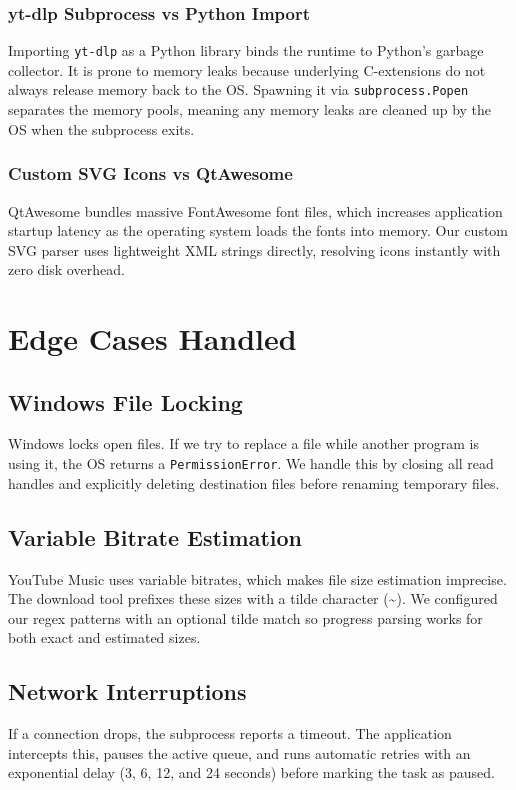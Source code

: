 \documentclass[12pt]{report}
\begin{document}
\subsection{yt-dlp Subprocess vs Python Import}
Importing \texttt{yt-dlp} as a Python library binds the runtime to Python's garbage collector. It is prone to memory leaks because underlying C-extensions do not always release memory back to the OS. Spawning it via \texttt{subprocess.Popen} separates the memory pools, meaning any memory leaks are cleaned up by the OS when the subprocess exits.

\subsection{Custom SVG Icons vs QtAwesome}
QtAwesome bundles massive FontAwesome font files, which increases application startup latency as the operating system loads the fonts into memory. Our custom SVG parser uses lightweight XML strings directly, resolving icons instantly with zero disk overhead.

\newpage
\chapter{Edge Cases Handled}

\section{Windows File Locking}
Windows locks open files. If we try to replace a file while another program is using it, the OS returns a \texttt{PermissionError}. We handle this by closing all read handles and explicitly deleting destination files before renaming temporary files.

\section{Variable Bitrate Estimation}
YouTube Music uses variable bitrates, which makes file size estimation imprecise. The download tool prefixes these sizes with a tilde character (\textasciitilde{}). We configured our regex patterns with an optional tilde match so progress parsing works for both exact and estimated sizes.

\section{Network Interruptions}
If a connection drops, the subprocess reports a timeout. The application intercepts this, pauses the active queue, and runs automatic retries with an exponential delay (3, 6, 12, and 24 seconds) before marking the task as paused.
\end{document}
